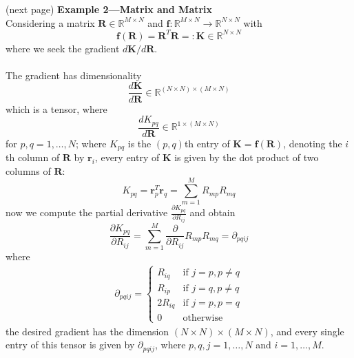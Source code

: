 \documentclass{report}
\begin{document}
(next page)
\newpage
\noindent\textbf{Example 2---Matrix and Matrix}\\
Considering a matrix $\bm{R}\in\mathbb{R}^{M\times N}$ and
$\bm{f}:\mathbb{R}^{M\times N}\to\mathbb{R}^{N\times N}$ with
\begin{equation*}
\bm{f}(\bm{R})=\bm{R}^T\bm{R}=:\bm{K}\in\mathbb{R}^{N\times N}
\end{equation*}
where we seek the gradient $d\bm{K}/d\bm{R}$.\\
\vspace{1mm}\\
The gradient has dimensionality
\begin{equation*}
\frac{d\bm{K}}{d\bm{R}}\in\mathbb{R}^{(N\times N)\times(M\times N)}
\end{equation*}
which is a tensor, where
\begin{equation*}
\frac{dK_{pq}}{d\bm{R}}\in\mathbb{R}^{1\times(M\times N)}
\end{equation*}
for $p,q=1,\ldots,N$; where $K_{pq}$ is the $(p,q)$th entry of $\bm{K}=\bm{f}(\bm{R})$, denoting the $i$th column of $\bm{R}$
by $\bm{r}_i$, every entry of $\bm{K}$ is given by the dot product of two columns of $\bm{R}$:
\begin{equation*}
K_{pq}=\bm{r}^T_p\bm{r}_q=\sum^M_{m=1}R_{mp}R_{mq}
\end{equation*}
now we compute the partial derivative $\frac{\partial K_{pq}}{\partial R_{ij}}$ and obtain
\begin{equation*}
\frac{\partial K_{pq}}{\partial R_{ij}}=\sum^M_{m=1}
\frac{\partial}{\partial R_{ij}}R_{mp}R_{mq}=\partial_{pqij}
\end{equation*}
where
\begin{align*}
\partial_{pqij}=\begin{cases}
R_{iq}&\text{if }j=p,p\neq q\\
R_{ip}&\text{if }j=q,p\neq q\\
2R_{iq}&\text{if }j=p,p=q\\
0&\text{otherwise}
\end{cases}
\end{align*}
the desired gradient has the dimension $(N\times N)\times(M\times N)$, and every single entry of this tensor is given
by $\partial_{pqij}$, where $p,q,j=1,\ldots,N$ and $i=1,\ldots,M$.
\newpage
\end{document}

